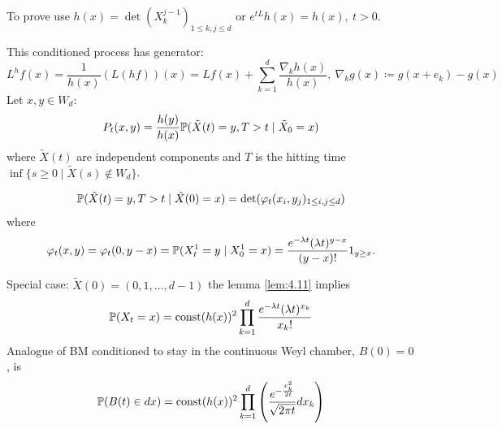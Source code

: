 \begin{remark}
    To prove use $h(x)=\det(X_k^{j-1})_{1\leq k,j\leq d}$ or $e^{tL}h(x)=h(x),\ t>0$.
\end{remark}

This conditioned process has generator:
\[L^h f(x)=\frac{1}{h(x)}(L(hf))(x)=Lf(x)+\sum_{k=1}^d\frac{\nabla_k h(x)}{h(x)},\ \nabla_k g(x)\coloneqq g(x+e_k)-g(x)\]
Let $x,y\in W_d$:\begin{align*}
    P_t(x,y)=\frac{h(y)}{h(x)}\mathbb{P}(\tilde{X}(t)=y,T>t\mid \tilde{X}_0=x)
\end{align*}
where $\tilde{X}(t)$ are independent components and $T$ is the hitting time $\inf\{s\geq 0\mid \tilde{X}(s)\notin W_d\}$.

\begin{lemma}\label{lem:4.11}
    \begin{align*}
        \mathbb{P}(\tilde{X}(t)=y,T>t\mid \tilde{X}(0)=x)=\det(\varphi_t(x_i,y_j)_{1\leq i,j\leq d})
    \end{align*}    
    where 
    \[\varphi_t(x,y)=\varphi_t(0,y-x)=\mathbb{P}(X_t^1=y\mid X_0^1=x)=\frac{e^{-\lambda t}(\lambda t)^{y-x}}{(y-x)!}1_{y\geq x}.\]
\end{lemma}

Special case: $\tilde{X}(0)=(0,1,\dots,d-1)$ the lemma \ref{lem:4.11} implies 
\[\mathbb{P}(X_t=x)=\text{const}(h(x))^2\prod_{k=1}^d \frac{e^{-\lambda t}(\lambda t)^{x_k}}{x_k!}\]
Analogue of BM conditioned to stay in the continuous Weyl chamber, $B(0)=0$, is 
\[\mathbb{P}(B(t)\in dx)=\text{const} (h(x))^2\prod_{k=1}^d\left(\frac{e^{-\frac{x_k^2}{2t}}}{\sqrt{2\pi t}}dx_k\right)\]
